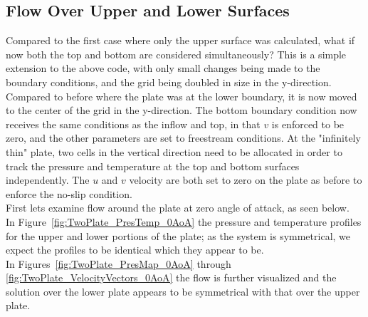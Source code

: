\documentclass[10pt,a4paper]{article}
\begin{document}
\FloatBarrier



\subsection*{Flow Over Upper and Lower Surfaces}


Compared to the first case where only the upper surface was calculated, what if now both the top and bottom are considered simultaneously? This is a simple extension to the above code, with only small changes being made to the boundary conditions, and the grid being doubled in size in the y-direction.\\

Compared to before where the plate was at the lower boundary, it is now moved to the center of the grid in the y-direction. The bottom boundary condition now receives the same conditions as the inflow and top, in that $v$ is enforced to be zero, and the other parameters are set to freestream conditions. At the "infinitely thin" plate, two cells in the vertical direction need to be allocated in order to track the pressure and temperature at the top and bottom surfaces independently. The $u$ and $v$ velocity are both set to zero on the plate as before to enforce the no-slip condition.\\

First lets examine flow around the plate at zero angle of attack, as seen below.\\

In Figure~\ref{fig:TwoPlate_PresTemp_0AoA} the pressure and temperature profiles for the upper and lower portions of the plate; as the system is symmetrical, we expect the profiles to be identical which they appear to be.\\

In Figures~\ref{fig:TwoPlate_PresMap_0AoA} through \ref{fig:TwoPlate_VelocityVectors_0AoA} the flow is further visualized and the solution over the lower plate appears to be symmetrical with that over the upper plate.\\

\FloatBarrier
\end{document}
